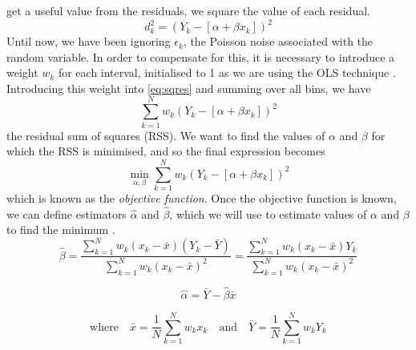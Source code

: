 \documentclass[a4paper,11pt]{article}
\begin{document}
get a useful value from the residuals, we square the value of each residual.
\begin{equation}\label{eq:sqres}
d_k^2=(Y_k-[\alpha +\beta x_k])^2
\end{equation}
Until now, we have been ignoring ${\epsilon}_k$, the Poisson noise associated
with the random variable. In order to compensate for this, it is necessary to
introduce a weight $w_k$ for each interval, initialised to 1 as we are using
the OLS technique \cite{massey1996estimating}. Introducing this weight into
\eqref{eq:sqres} and summing over all bins, we have
\begin{equation}
\sum_{k=1}^N w_k(Y_k-[\alpha +\beta x_k])^2
\end{equation}
the residual sum of squares (RSS). We want to find the values of $\alpha$ and
$\beta$ for which the RSS is minimised, and so the final expression becomes
\begin{equation}
\min_{\alpha,\beta}\sum_{k=1}^N w_k(Y_k-[\alpha +\beta x_k])^2
\end{equation}
which is known as the \emph{objective function}. Once the objective function is
known, we can define estimators $\hat{\alpha}$ and $\hat{\beta}$, which we
will use to estimate values of $\alpha$ and $\beta$ to find the minimum \cite{massey1996estimating}.
\begin{equation}
\hat{\beta}
=\frac{\displaystyle\sum_{k=1}^N w_k(x_k-\bar{x})(Y_k-\bar{Y})}{\displaystyle \sum_{k=1}^N w_k(x_k-\bar{x})^2}
=\frac{\displaystyle\sum_{k=1}^N w_k(x_k-\bar{x})Y_k}{\displaystyle\sum_{k=1}^N w_k(x_k-\bar{x})^2}
\end{equation}

\begin{equation}
\hat{\alpha}=\bar{Y}-\hat{\beta}\bar{x}
\end{equation}

\begin{equation}
\text{where}\quad
\bar{x}=\frac{1}{N}\sum_{k=1}^N w_kx_k\quad \text{and}\quad
\bar{Y}=\frac{1}{N}\sum_{k=1}^N w_kY_k
\end{equation}
\end{document}
